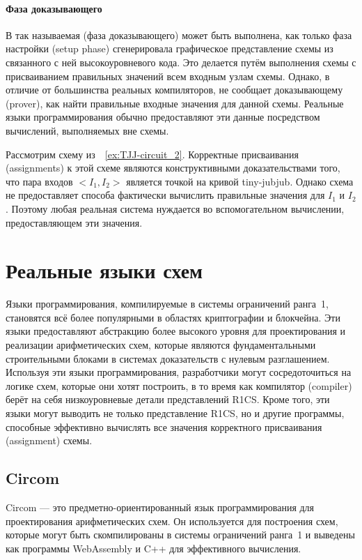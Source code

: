 \paragraph{Фаза доказывающего} В  так называемая  (фаза доказывающего) может быть выполнена, как только фаза настройки (setup phase) сгенерировала графическое представление схемы из связанного с ней высокоуровневого кода. Это делается путём выполнения схемы с присваиванием правильных значений всем входным узлам схемы. Однако, в отличие от большинства реальных компиляторов,  не сообщает доказывающему (prover), как найти правильные входные значения для данной схемы. Реальные языки программирования обычно предоставляют эти данные посредством вычислений, выполняемых вне схемы.
\begin{example} Рассмотрим схему из~\examplename{}~\ref{ex:TJJ-circuit_2}. Корректные присваивания (assignments) к этой схеме являются конструктивными доказательствами того, что пара входов $<I_1,I_2>$ является точкой на кривой tiny-jubjub. Однако схема не предоставляет способа фактически вычислить правильные значения для $I_1$ и $I_2$. Поэтому любая реальная система нуждается во вспомогательном вычислении, предоставляющем эти значения.
\end{example}
\section{Реальные языки схем}
Языки программирования, компилируемые в системы ограничений ранга~1, становятся всё более популярными в областях криптографии и блокчейна. Эти языки предоставляют абстракцию более высокого уровня для проектирования и реализации арифметических схем, которые являются фундаментальными строительными блоками в системах доказательств с нулевым разглашением. Используя эти языки программирования, разработчики могут сосредоточиться на логике схем, которые они хотят построить, в то время как компилятор (compiler) берёт на себя низкоуровневые детали представлений R1CS. Кроме того, эти языки могут выводить не только представление R1CS, но и другие программы, способные эффективно вычислять все значения корректного присваивания (assignment) схемы.

\subsection{Circom}
Circom --- это предметно-ориентированный язык программирования для проектирования арифметических схем. Он используется для построения схем, которые могут быть скомпилированы в системы ограничений ранга~1 и выведены как программы WebAssembly и C++ для эффективного вычисления.

